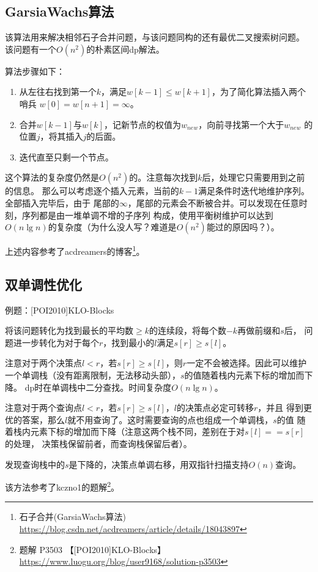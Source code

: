 \subsection{GarsiaWachs算法}
该算法用来解决相邻石子合并问题，与该问题同构的还有最优二叉搜索树问题。
该问题有一个$O(n^2)$的朴素区间dp解法。

算法步骤如下：
\begin{enumerate}
    \item 从左往右找到第一个$k$，满足$w[k-1] \leq w[k+1]$，为了简化算法插入两个哨兵
    $w[0]=w[n+1]=\infty$。
    \item 合并$w[k-1]$与$w[k]$，记新节点的权值为$w_{new}$，向前寻找第一个大于$w_{new}$
    的位置$j$，将其插入$j$的后面。
    \item 迭代直至只剩一个节点。
\end{enumerate}

这个算法的复杂度仍然是$O(n^2)$的。注意每次找到$k$后，处理它只需要用到之前的信息。
那么可以考虑逐个插入元素，当前的$k-1$满足条件时迭代地维护序列。全部插入完毕后，由于
尾部的$\infty$，尾部的元素会不断被合并。可以发现在任意时刻，序列都是由一堆单调不增的子序列
构成，使用平衡树维护可以达到$O(n\lg n)$的复杂度（为什么没人写？难道是$O(n^2)$能过的原因吗？）。


上述内容参考了acdreamers的博客\footnote{
    石子合并(GarsiaWachs算法)\\
    \url{https://blog.csdn.net/acdreamers/article/details/18043897}
}。
\subsection{双单调性优化}
例题：[POI2010]KLO-Blocks

将该问题转化为找到最长的平均数$\geq k$的连续段，将每个数$-k$再做前缀和$s$后，
问题进一步转化为对于每个$r$，找到最小的$l$满足$s[r]\geq s[l]$。

注意对于两个决策点$l<r$，若$s[r]\geq s[l]$，则$r$一定不会被选择。因此可以维护
一个单调栈（没有距离限制，无法移动头部），$s$的值随着栈内元素下标的增加而下降。
dp时在单调栈中二分查找。时间复杂度$O(n\lg n)$。

注意对于两个查询点$l<r$，若$s[r]\geq s[l]$，$l$的决策点必定可转移$r$，并且
得到更优的答案，那么$l$就不用查询了。这时需要查询的点也组成一个单调栈，$s$的值
随着栈内元素下标的增加而下降（注意这两个栈不同，差别在于对$s[l]==s[r]$的处理，
决策栈保留前者，而查询栈保留后者）。

发现查询栈中的$s$是下降的，决策点单调右移，用双指针扫描支持$O(n)$查询。

该方法参考了kczno1的题解\footnote{
    题解 P3503 【[POI2010]KLO-Blocks】\\
    \url{https://www.luogu.org/blog/user9168/solution-p3503}
}。
